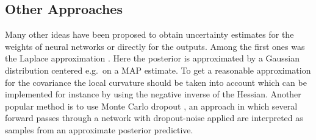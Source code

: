 \documentclass[../thesis.tex]{subfiles}
\begin{document}
\subsection{Other Approaches}
Many other ideas have been proposed to obtain uncertainty estimates for the weights of neural networks or directly for the outputs. Among the first ones was the Laplace approximation \parencite{mackay1992practical}. Here the posterior is approximated by a Gaussian distribution centered e.g.\ on a MAP estimate. To get a reasonable approximation for the covariance the local curvature should be taken into account which can be implemented for instance by using the negative inverse of the Hessian. 
Another popular method is to use Monte Carlo dropout \parencite{gal2016dropout}, an approach in which several forward passes through a network with dropout-noise \parencite{srivastava2014dropout} applied are interpreted as samples from an approximate posterior predictive.
\end{document}
